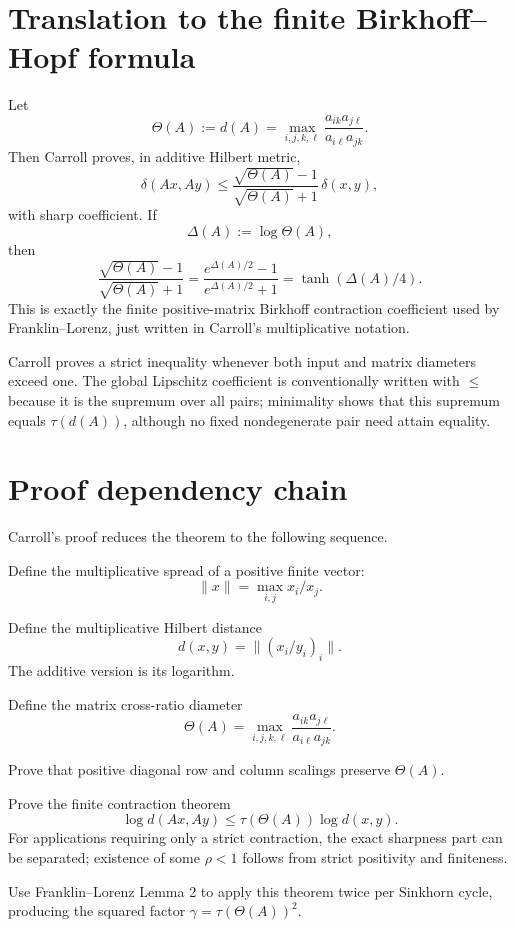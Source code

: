 \section*{Translation to the finite Birkhoff--Hopf formula}
Let
\[
  \Theta(A):=d(A)=\max_{i,j,k,\ell}\frac{a_{ik}a_{j\ell}}{a_{i\ell}a_{jk}}.
\]
Then Carroll proves, in additive Hilbert metric,
\[
  \delta(Ax,Ay)
  \le \frac{\sqrt{\Theta(A)}-1}{\sqrt{\Theta(A)}+1}\,\delta(x,y),
\]
with sharp coefficient.  If
\[
  \Delta(A):=\log\Theta(A),
\]
then
\[
  \frac{\sqrt{\Theta(A)}-1}{\sqrt{\Theta(A)}+1}
  =\frac{e^{\Delta(A)/2}-1}{e^{\Delta(A)/2}+1}
  =\tanh(\Delta(A)/4).
\]
This is exactly the finite positive-matrix Birkhoff contraction coefficient used by
Franklin--Lorenz, just written in Carroll's multiplicative notation.

\begin{remark}
Carroll proves a strict inequality whenever both input and matrix diameters exceed one.  The global Lipschitz coefficient is conventionally written with $\le$ because it is the supremum over all pairs; minimality shows that this supremum equals $\tau(d(A))$, although no fixed nondegenerate pair need attain equality.
\end{remark}

\section*{Proof dependency chain}
Carroll's proof reduces the theorem to the following sequence.
\begin{commentarynotes}
\item Define the multiplicative spread of a positive finite vector:
\[
  \|x\|=\max_{i,j}x_i/x_j.
\]
\item Define the multiplicative Hilbert distance
\[
  d(x,y)=\|(x_i/y_i)_i\|.
\]
The additive version is its logarithm.
\item Define the matrix cross-ratio diameter
\[
  \Theta(A)=\max_{i,j,k,\ell}\frac{a_{ik}a_{j\ell}}{a_{i\ell}a_{jk}}.
\]
\item Prove that positive diagonal row and column scalings preserve $\Theta(A)$.
\item Prove the finite contraction theorem
\[
  \log d(Ax,Ay)
  \le \tau(\Theta(A))\log d(x,y).
\]
For applications requiring only a strict contraction, the exact sharpness part can be separated; existence of some
$\rho<1$ follows from strict positivity and finiteness.
\item Use Franklin--Lorenz Lemma 2 to apply this theorem twice per Sinkhorn cycle,
producing the squared factor $\gamma=\tau(\Theta(A))^2$.
\end{commentarynotes}

